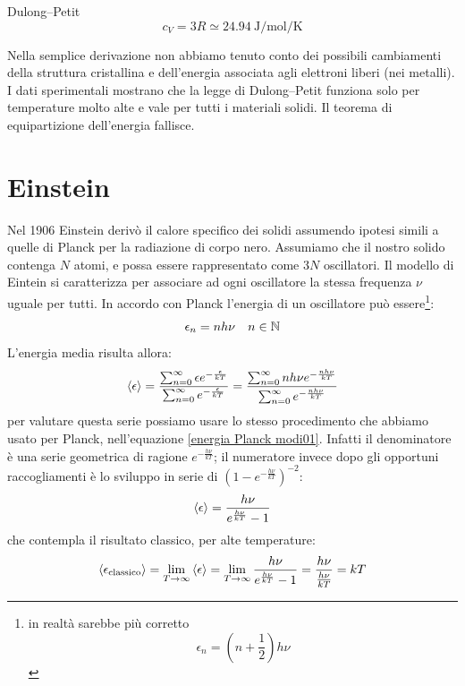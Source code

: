 \begin{legge}{Dulong--Petit}
	\begin{equation}
		c_V=3R\simeq \SI{24.94}{\joule\per\mole\per\kelvin}
	\end{equation}
\end{legge}Nella semplice derivazione non abbiamo tenuto conto dei possibili cambiamenti della struttura cristallina e dell'energia associata agli elettroni liberi (nei metalli). I dati sperimentali mostrano che la legge di Dulong--Petit funziona solo per temperature molto alte e vale per tutti i materiali solidi. Il teorema di equipartizione dell'energia fallisce.
\section{Einstein}
Nel 1906 Einstein derivò il calore specifico dei solidi assumendo ipotesi simili a quelle di Planck per la radiazione di corpo nero. Assumiamo che il nostro solido contenga $N$ atomi, e possa essere rappresentato come $3N$ oscillatori. Il modello di Eintein si caratterizza per associare ad ogni oscillatore la stessa frequenza $\nu$ uguale per tutti. In accordo con Planck l'energia di un oscillatore può essere\footnote{in realtà sarebbe più corretto\[\epsilon_n=\left(n+\frac{1}{2}\right)h\nu\]}:
\begin{equation}
	\epsilon_n=nh\nu\quad n\in\mathbb{N}
\end{equation}
L'energia media risulta allora:
\begin{equation}
	\left<\epsilon\right>=\dfrac{\sum_{n=0}^{\infty}\epsilon e^{-\frac{\epsilon}{kT}}}{\sum_{n=0}^\infty e^{-\frac{\epsilon}{kT}}}=\dfrac{\sum_{n=0}^{\infty}nh\nu e^{-\frac{nh\nu}{kT}}}{\sum_{n=0}^\infty e^{-\frac{nh\nu}{kT}}}
\end{equation}
per valutare questa serie possiamo usare lo stesso procedimento che abbiamo usato per Planck, nell'equazione \eqref{energia Planck modi01}. Infatti il denominatore è una serie geometrica di ragione $e^{-\frac{h\nu}{kT}}$; il numeratore invece dopo gli opportuni raccogliamenti è lo sviluppo in serie di $\left(1-e^{-\frac{h\nu}{kT}}\right)^{-2}$:
\begin{equation}
	\left<\epsilon\right>=\dfrac{h\nu}{e^{\frac{h\nu}{kT}}-1}
\end{equation}
che contempla il risultato classico, per alte temperature:
\begin{equation}
	\left<\epsilon_\text{classico}\right>=\lim_{T\to\infty}\left<\epsilon\right>=\lim_{T\to\infty}\dfrac{h\nu}{e^{\frac{h\nu}{kT}}-1}=\frac{h\nu}{\frac{h\nu}{kT}}=kT
\end{equation}
